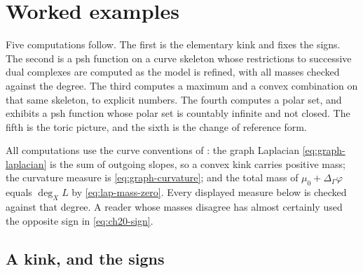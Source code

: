 \section{Worked examples}
\label{sec:ch21-worked}

Five computations follow.  The first is the elementary kink and fixes the
signs.  The second is a psh function on a curve skeleton whose restrictions
to successive dual complexes are computed as the model is refined, with all
masses checked against the degree.  The third computes a maximum and a
convex combination on that same skeleton, to explicit numbers.  The fourth
computes a polar set, and exhibits a psh function whose polar set is
countably infinite and not closed.  The fifth is the toric picture, and the
sixth is the change of reference form.

All computations use the curve conventions of :
the graph Laplacian \eqref{eq:graph-laplacian} is the sum of outgoing
slopes, so a convex kink carries positive mass; the curvature measure is
\eqref{eq:graph-curvature}; and the total mass of
\(\mu_0+\Delta_\Gamma\varphi\) equals \(\deg_XL\) by
\eqref{eq:lap-mass-zero}.  Every displayed measure below is checked against
that degree.  A reader whose masses disagree has almost certainly used the
opposite sign in \eqref{eq:ch20-sign}.

\subsection{A kink, and the signs}
\label{sec:ch21-worked-kink}


